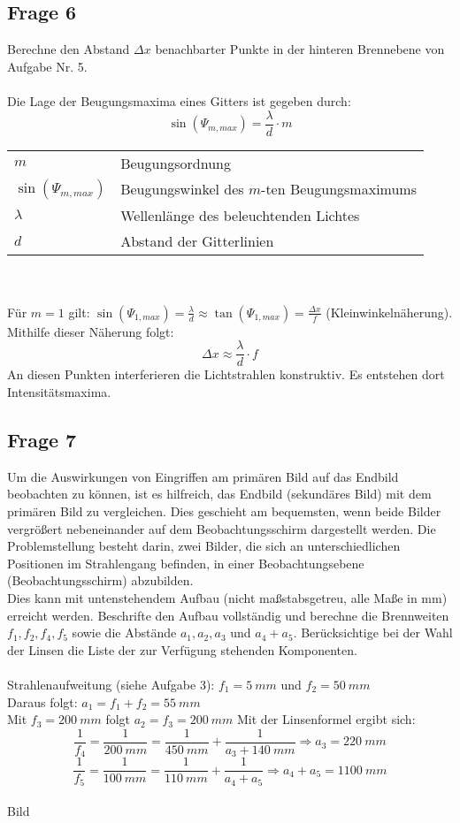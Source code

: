 \documentclass[a4paper,10pt]{scrartcl}
\begin{document}
	\subsection{Frage 6}
		Berechne den Abstand $\Delta x$ benachbarter Punkte in der hinteren Brennebene von\\Aufgabe Nr. 5.
		\\
		\\
		Die Lage der Beugungsmaxima eines Gitters ist gegeben durch:
			\[\sin(\Psi_{m,max}) = \frac{\lambda}{d} \cdot m\]
		\begin{tabular}{ll}
			$m$ & Beugungsordnung\\
			$\sin(\Psi_{m,max})$ & Beugungswinkel des $m$-ten Beugungsmaximums\\
			$\lambda$ & Wellenlänge des beleuchtenden Lichtes\\
			$d$ & Abstand der Gitterlinien
		\end{tabular}
		\\
		\\
		Für $m = 1$ gilt: $\sin(\Psi_{1,max}) = \frac{\lambda}{d} \approx \tan(\Psi_{1,max}) = \frac{\Delta x}{f}$ (Kleinwinkelnäherung).\\
		Mithilfe dieser Näherung folgt:
			\[\Delta x \approx \frac{\lambda}{d} \cdot f\]
		An diesen Punkten interferieren die Lichtstrahlen konstruktiv. Es entstehen dort Intensitätsmaxima.

	\subsection{Frage 7}
		Um die Auswirkungen von Eingriffen am primären Bild auf das Endbild beobachten zu können, ist es hilfreich, das Endbild (sekundäres Bild) mit dem primären Bild zu vergleichen. Dies geschieht am bequemsten, wenn beide Bilder vergrößert nebeneinander auf dem Beobachtungsschirm dargestellt werden. Die Problemstellung besteht darin, zwei Bilder, die sich an unterschiedlichen Positionen im Strahlengang befinden, in einer Beobachtungsebene (Beobachtungsschirm) abzubilden.\\
		Dies kann mit untenstehendem Aufbau (nicht maßstabsgetreu, alle Maße in mm) erreicht werden. Beschrifte den Aufbau vollständig und berechne die Brennweiten $f_1, f_2, f_4, f_5$ sowie die Abstände $a_1, a_2, a_3$ und $a_4 + a_5$. Berücksichtige bei der Wahl der Linsen die Liste der zur Verfügung stehenden Komponenten.
		\\
		\\
		Strahlenaufweitung (siehe Aufgabe 3): $f_1 = \SI{5}{mm}$ und $f_2 = \SI{50}{mm}$\\
		Daraus folgt: $a_1 = f_1 + f_2 = \SI{55}{mm}$\\
		Mit $f_3 = \SI{200}{mm}$ folgt $a_2 = f_3 = \SI{200}{mm}$
		Mit der Linsenformel ergibt sich:
			\[\frac{1}{f_4} = \frac{1}{\SI{200}{mm}} = \frac{1}{\SI{450}{mm}} + \frac{1}{a_3 + \SI{140}{mm}} \Rightarrow a_3 = \SI{220}{mm}\]
			\[\frac{1}{f_5} = \frac{1}{\SI{100}{mm}} = \frac{1}{\SI{110}{mm}} + \frac{1}{a_4 + a_5} \Rightarrow a_4 + a_5 = \SI{1100}{mm}\]
		\\
		Bild
		\\
	
\end{document}
